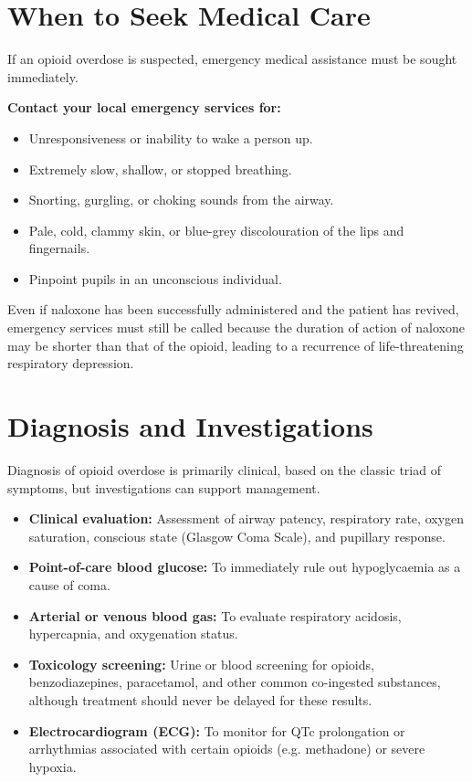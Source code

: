 \section*{When to Seek Medical Care}
If an opioid overdose is suspected, emergency medical assistance must be sought immediately.

\textbf{Contact your local emergency services for:}
\begin{itemize}
    \item Unresponsiveness or inability to wake a person up.
    \item Extremely slow, shallow, or stopped breathing.
    \item Snorting, gurgling, or choking sounds from the airway.
    \item Pale, cold, clammy skin, or blue-grey discolouration of the lips and fingernails.
    \item Pinpoint pupils in an unconscious individual.
\end{itemize}
Even if naloxone has been successfully administered and the patient has revived, emergency services must still be called because the duration of action of naloxone may be shorter than that of the opioid, leading to a recurrence of life-threatening respiratory depression.

\section*{Diagnosis and Investigations}
Diagnosis of opioid overdose is primarily clinical, based on the classic triad of symptoms, but investigations can support management.
\begin{itemize}
    \item \textbf{Clinical evaluation:} Assessment of airway patency, respiratory rate, oxygen saturation, conscious state (Glasgow Coma Scale), and pupillary response.
    \item \textbf{Point-of-care blood glucose:} To immediately rule out hypoglycaemia as a cause of coma.
    \item \textbf{Arterial or venous blood gas:} To evaluate respiratory acidosis, hypercapnia, and oxygenation status.
    \item \textbf{Toxicology screening:} Urine or blood screening for opioids, benzodiazepines, paracetamol, and other common co-ingested substances, although treatment should never be delayed for these results.
    \item \textbf{Electrocardiogram (ECG):} To monitor for QTc prolongation or arrhythmias associated with certain opioids (e.g. methadone) or severe hypoxia.
\end{itemize}

